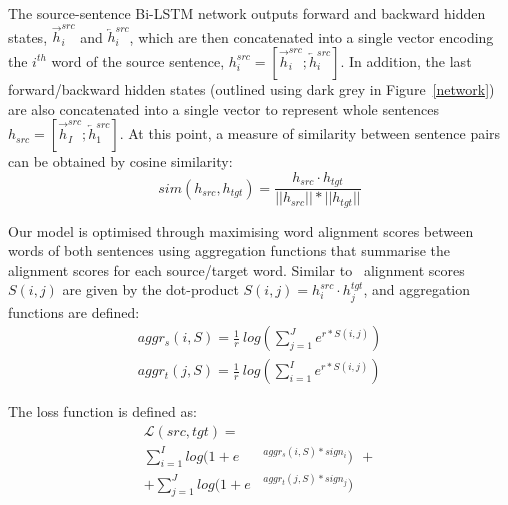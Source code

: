 \documentclass[11pt,a4paper]{article}
\begin{document}
The source-sentence Bi-LSTM network outputs forward and backward hidden states, $\overrightarrow{h}^{src}_i$ and $\overleftarrow{h}^{src}_i$, which are then concatenated into a single vector encoding the $i^{th}$ word of the source sentence, 
$h^{src}_i = [ \overrightarrow{h}^{src}_i ; \overleftarrow{h}^{src}_i ]$.
In addition, the last forward/backward hidden states (outlined using dark grey in Figure~\ref{network}) are also concatenated into a single vector  to represent whole sentences 
$h_{src} = [ \overrightarrow{h}^{src}_I ; \overleftarrow{h}^{src}_1 ]$.
At this point, a measure of similarity between sentence pairs can be obtained by cosine similarity:
\begin{equation}
    sim(h_{src}, h_{tgt}) = \frac{h_{src} \cdotp h_{tgt}}{||h_{src}|| * ||h_{tgt}||}
    \label{cosine}
\end{equation}

Our model is optimised through maximising word alignment scores between words of both sentences using aggregation functions that summarise the alignment scores for each source/target word. 
Similar to~\cite{W16-2207} alignment scores $S(i,j)$ are given by the dot-product $S(i,j) = h_i^{src} \cdotp h_j^{tgt}$, and aggregation functions are defined:   
\begin{equation}
\begin{split}
    aggr_s(i,S) = \frac{1}{r} \ log \left( \displaystyle \sum_{j=1}^{J} e^{r * S(i,j)}\right) \\
    aggr_t(j,S) = \frac{1}{r} \ log \left( \displaystyle \sum_{i=1}^{I} e^{r * S(i,j)}\right)
\end{split}
\label{aggregation}
\end{equation}


The loss function is defined as:
\begin{equation}
\begin{split}
\mathcal{L}(src,tgt) = \ \ \ \ & \\
    \sum_{i=1}^I log(1+e&^{aggr_s(i,S) * sign_i}) \ \ +\\
 + \sum_{j=1}^J log(1+e&^{aggr_t(j,S) * sign_j})
\end{split}
\label{loss_wemb}
\end{equation}
\end{document}
